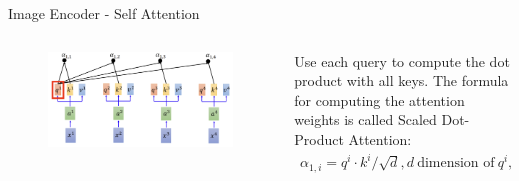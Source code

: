 \documentclass[aspectratio=169,xcolor=dvipsnames]{beamer}
\begin{document}
\begin{frame}{Image Encoder - Self Attention}
    \begin{columns}
        \begin{column}{0.6\textwidth}
            \begin{figure}
                \centering
                \includegraphics[width=1\linewidth]{figures/self_attention_dot_product.png}
                \label{self_attention_dot_product}
            \end{figure}
        \end{column}

        \begin{column}{0.4\textwidth}
            Use each query to compute the dot product with all keys. The formula for computing the attention weights is called Scaled Dot-Product Attention:
            \begin{align*}
                \alpha_{1,i}= q^i \cdot k^i / \sqrt{d}, d \ \text{dimension of} \ q^i, k^i
            \end{align*}  
        \end{column}
    \end{columns}
\end{frame}

\end{document}
